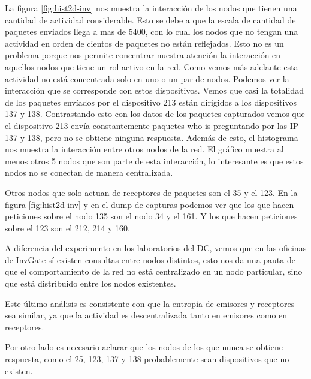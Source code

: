 La figura \ref{fig:hist2d-inv} nos muestra la interacción de los nodos que tienen una cantidad de actividad considerable. Esto se debe a que la escala de cantidad de paquetes enviados llega a mas de 5400, con lo cual los nodos que no tengan una actividad en orden de cientos de paquetes no están reflejados. Esto no es un problema porque nos permite concentrar nuestra atención la interacción en aquellos nodos que tiene un rol activo en la red. Como vemos más adelante esta actividad no está concentrada solo en uno o un par de nodos.
Podemos ver la interacción que se corresponde con estos dispositivos. Vemos que casi la totalidad de los paquetes envíados por el dispositivo 213 están dirigidos a los dispositivos 137 y 138.  Contrastando esto con los datos de los paquetes capturados vemos que el dispositivo 213 envía constantemente paquetes who-is preguntando por las IP 137 y 138, pero no se obtiene ninguna respuesta.
Además de esto, el histograma nos muestra la interacción entre otros nodos de la red. El gráfico muestra al menos otros 5 nodos que son parte de esta interacción, lo interesante es que estos nodos no se conectan de manera centralizada.

Otros nodos que solo actuan de receptores de paquetes son el 35 y el 123. En la figura \ref{fig:hist2d-inv} y en el dump de capturas podemos ver que los que hacen peticiones sobre el nodo 135 son el nodo 34 y el 161. Y los que hacen peticiones sobre el 123 son el 212, 214 y 160.

A diferencia del experimento en los laboratorios del DC, vemos que en las oficinas de InvGate sí existen consultas entre nodos distintos, esto nos da una pauta de que el comportamiento de la red no está centralizado en un nodo particular, sino que está distribuido entre los nodos existentes. 

Este último análisis es consistente con que la entropía de emisores y receptores sea similar, ya que la actividad es descentralizada tanto en emisores como en receptores.

Por otro lado es necesario aclarar que los nodos de los que nunca se obtiene respuesta, como el 25, 123, 137 y 138 probablemente sean dispositivos que no existen.

